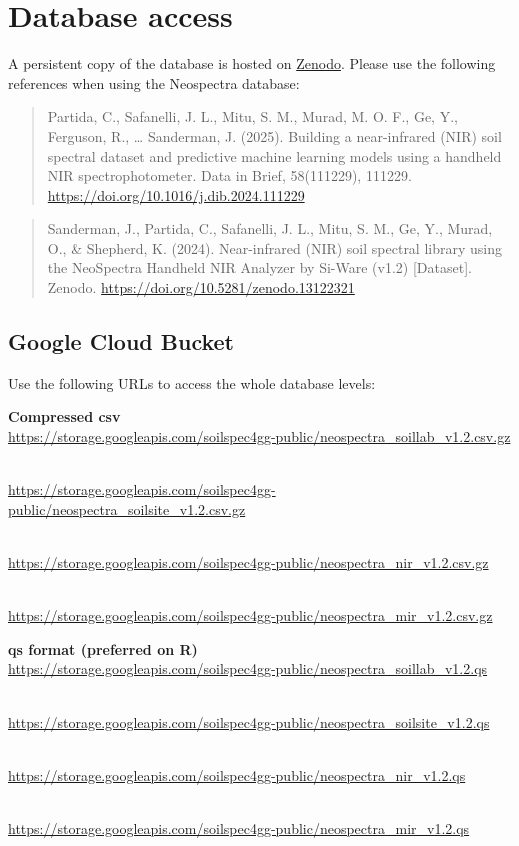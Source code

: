 \documentclass[
  letterpaper,
  DIV=11,
  numbers=noendperiod]{scrreprt}
\begin{document}
\section{Database access}\label{database-access}

A persistent copy of the database is hosted on
\href{https://zenodo.org/record/7600137}{Zenodo}. Please use the
following references when using the Neospectra database:

\begin{quote}
Partida, C., Safanelli, J. L., Mitu, S. M., Murad, M. O. F., Ge, Y.,
Ferguson, R., \ldots{} Sanderman, J. (2025). Building a near-infrared
(NIR) soil spectral dataset and predictive machine learning models using
a handheld NIR spectrophotometer. Data in Brief, 58(111229), 111229.
\url{https://doi.org/10.1016/j.dib.2024.111229}
\end{quote}

\begin{quote}
Sanderman, J., Partida, C., Safanelli, J. L., Mitu, S. M., Ge, Y.,
Murad, O., \& Shepherd, K. (2024). Near-infrared (NIR) soil spectral
library using the NeoSpectra Handheld NIR Analyzer by Si-Ware (v1.2)
{[}Dataset{]}. Zenodo. \url{https://doi.org/10.5281/zenodo.13122321}
\end{quote}

\subsection{Google Cloud Bucket}\label{google-cloud-bucket}

Use the following URLs to access the whole database levels:

\textbf{Compressed csv}\\
\url{https://storage.googleapis.com/soilspec4gg-public/neospectra_soillab_v1.2.csv.gz}\strut \\
\url{https://storage.googleapis.com/soilspec4gg-public/neospectra_soilsite_v1.2.csv.gz}\strut \\
\url{https://storage.googleapis.com/soilspec4gg-public/neospectra_nir_v1.2.csv.gz}\strut \\
\url{https://storage.googleapis.com/soilspec4gg-public/neospectra_mir_v1.2.csv.gz}

\textbf{qs format (preferred on R)}\\
\url{https://storage.googleapis.com/soilspec4gg-public/neospectra_soillab_v1.2.qs}\strut \\
\url{https://storage.googleapis.com/soilspec4gg-public/neospectra_soilsite_v1.2.qs}\strut \\
\url{https://storage.googleapis.com/soilspec4gg-public/neospectra_nir_v1.2.qs}\strut \\
\url{https://storage.googleapis.com/soilspec4gg-public/neospectra_mir_v1.2.qs}
\end{document}
